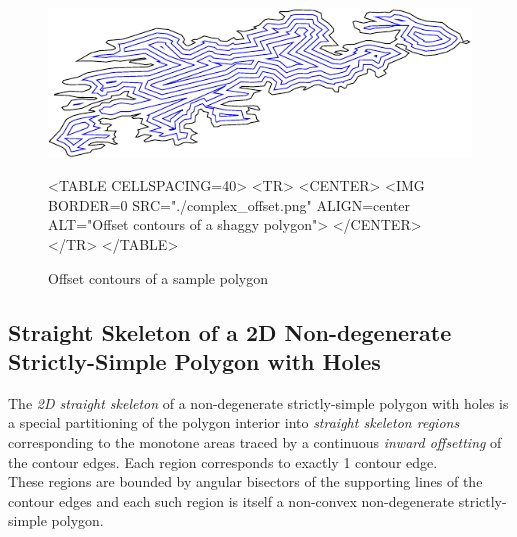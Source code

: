 \begin{figure}[htbp]
\begin{ccTexOnly}
\begin{center}
\includegraphics{Straight_skeleton_2/complex_offset} %
\end{center}
\end{ccTexOnly}
\begin{ccHtmlOnly}
<TABLE CELLSPACING=40>
<TR>
<CENTER>
<IMG BORDER=0 SRC="./complex_offset.png" ALIGN=center ALT="Offset contours of a shaggy polygon">
</CENTER>
</TR>
</TABLE>
\end{ccHtmlOnly}
\caption{Offset contours of a sample polygon
\label{Offsets}}
\end{figure}

\subsection{Straight Skeleton of a 2D Non-degenerate Strictly-Simple Polygon with Holes}
 
The {\em 2D straight skeleton} of a non-degenerate strictly-simple polygon with holes \cite{aaag-ntsp-95} is a special partitioning of the polygon interior into {\em straight skeleton regions} corresponding to the monotone areas traced by a continuous \textit{inward offsetting} of the contour edges. Each region corresponds to exactly 1 contour edge.\\
These regions are bounded by angular bisectors of the supporting lines of the contour edges and each such region is itself a non-convex non-degenerate strictly-simple polygon.

